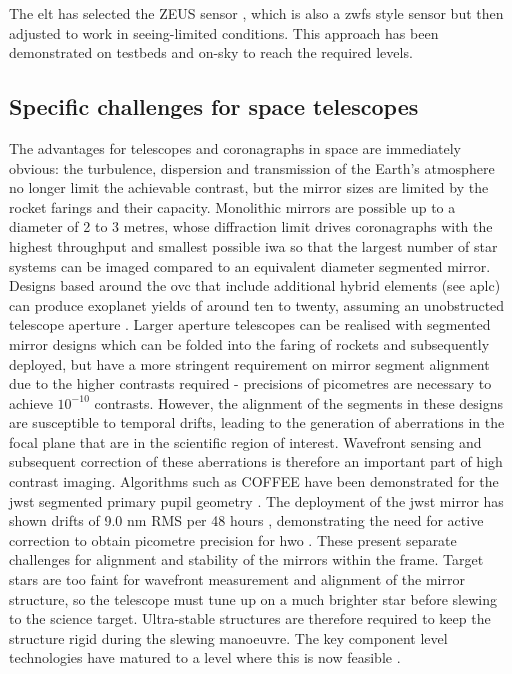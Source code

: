 \documentclass[letterpaper]{ar-1col}
\begin{document}
The \ac{elt} has selected the ZEUS sensor \citep{Dohlen06}, which is also a \ac{zwfs} style sensor but then adjusted to work in seeing-limited conditions.
%
This approach has been demonstrated on testbeds \citep{Pfrommer18} and on-sky \citet{Gonte09} to reach the required levels.

\subsection{Specific challenges for space telescopes}

The advantages for telescopes and coronagraphs in space are immediately obvious: the turbulence, dispersion and transmission of the Earth's atmosphere no longer limit the achievable contrast, but the mirror sizes are limited by the rocket farings and their capacity.
%
Monolithic mirrors are possible up to a diameter of 2 to 3 metres, whose diffraction limit drives coronagraphs with the highest throughput and smallest possible \ac{iwa} so that the largest number of star systems can be imaged compared to an equivalent diameter segmented mirror.
%
Designs based around the \ac{ovc} that include additional hybrid elements (see \ac{aplc}) can produce exoplanet yields of around ten to twenty, assuming an unobstructed telescope aperture \citep{Stark24}.
%
Larger aperture telescopes can be realised with segmented mirror designs which can be folded into the faring of rockets and subsequently deployed, but have a more stringent requirement on mirror segment alignment due to the higher contrasts required - precisions of picometres are necessary to achieve $10^{-10}$ contrasts.
%
However, the alignment of the segments in these designs are susceptible to temporal drifts, leading to the generation of aberrations in the focal plane that are in the scientific region of interest.
%
Wavefront sensing and subsequent correction of these aberrations is therefore an important part of high contrast imaging.
%
Algorithms such as COFFEE have been demonstrated for the \ac{jwst} segmented primary pupil geometry \citep{Leboulleux20}.
%
The deployment of the \ac{jwst} mirror has shown drifts of 9.0 nm RMS per 48 hours \citep{Lajoie23}, demonstrating the need for active correction to obtain picometre precision for \ac{hwo} \citep{Laginja22}.
%
These present separate challenges for alignment and stability of the mirrors within the frame.
%
Target stars are too faint for wavefront measurement and alignment of the mirror structure, so the telescope must tune up on a much brighter star before slewing to the science target.
%
Ultra-stable structures are therefore required to keep the structure rigid during the slewing manoeuvre.
%
The key component level technologies have matured to a level where this is now feasible \citep{Coyle21}.
\end{document}
